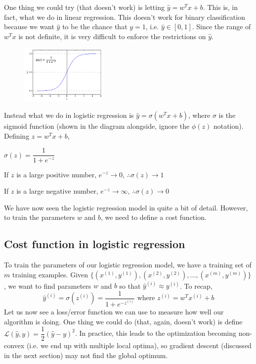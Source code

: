 \documentclass{article}[a4paper,12pt]
\theoremstyle{definition}
\newcommand{\Lagr}{\mathcal{L}}
\begin{document}
One thing we could try (that doesn't work) is letting $\hat{y}=w^Tx+b$. This is, in fact, what we do in linear regression. This doesn't work for binary classification because we want $\hat{y}$ to be the chance that $y=1$, i.e. $\hat{y}\in\left[0,1\right]$. Since the range of $w^Tx$ is not definite, it is very difficult to enforce the restrictions on $\hat{y}$.

\begin{figure}
\centering \includegraphics[width=0.38\textwidth]{sigmoid_logistic_regression.png}
\end{figure}
\vspace{6pt}

Instead what we do in logistic regression is $\hat{y}=\sigma(w^Tx+b)$, where $\sigma$ is the sigmoid function (shown in the diagram alongside, ignore the $\phi(z)$ notation). Defining $z=w^Tx+b$,
\begin{center}
$\boxed{\sigma(z)=\dfrac{1}{1+e^{-z}}}$
\end{center}
If $z$ is a large positive number, $e^{-z}\rightarrow 0$, $\therefore\sigma(z)\rightarrow 1$

If $z$ is a large negative number, $e^{-z}\rightarrow \infty$, $\therefore\sigma(z)\rightarrow 0$
\vspace{6pt}

We have now seen the logistic regression model in quite a bit of detail. However, to train the parameters $w$ and $b$, we need to define a cost function.
\subsection{Cost function in logistic regression}
To train the parameters of our logistic regression model, we have a training set of $m$ training examples. Given $\{(x^{(1)},y^{(1)}), (x^{(2)},y^{(2)}), \dots, (x^{(m)},y^{(m)})\}$, we want to find parameters $w$ and $b$ so that $\hat{y}^{(i)}\approx y^{(i)}$. To recap, $$\hat{y}^{(i)}=\sigma(z^{(i)})=\dfrac{1}{1+e^{-z^{(i)}}}\text{ where }z^{(i)}=w^Tx^{(i)}+b$$
Let us now see a loss/error function we can use to measure how well our algorithm is doing. One thing we could do (that, again, doesn't work) is define $\Lagr(\hat{y},y)=\dfrac{1}{2}(\hat{y}-y)^2$. In practice, this leads to the optimization becoming non-convex (i.e. we end up with multiple local optima), so gradient descent (discussed in the next section) may not find the global optimum.
\vspace{6pt}
\end{document}
